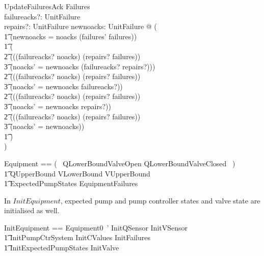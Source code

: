 \documentclass{report} %
\begin{document}
\begin{schema}{UpdateFailuresAck}
    \Delta Failures \\
    failureacks?: \power UnitFailure \\
    repairs?: \power UnitFailure
    \where
    \exists newnoacks: \power UnitFailure @ ( \\
        \t1 (newnoacks = noacks \cup (failures' \setminus failures)) \land \\ %
        \t1 ( \\
            \t2 (((failureacks? \subseteq noacks) \land (repairs? \subseteq failures)) \\
            \t3    \implies (noacks' = newnoacks \setminus (failureacks? \cup repairs?))) \land \\
            \t2 (((failureacks? \subseteq noacks) \land \lnot (repairs? \subseteq failures)) \\ 
            \t3    \implies (noacks' = newnoacks \setminus failureacks?)) \land \\
            \t2 ((\lnot (failureacks? \subseteq noacks) \land (repairs? \subseteq failures)) \\
            \t3    \implies (noacks' = newnoacks \setminus repairs?)) \land \\
            \t2 ((\lnot (failureacks? \subseteq noacks) \land \lnot (repairs? \subseteq failures)) \\
            \t3    \implies (noacks' = newnoacks)) \\
        \t1 ) \\
    )
\end{schema}

\begin{zed}
  Equipment == (~ QLowerBoundValveOpen \lor QLowerBoundValveClosed ~) \land {} \\
    \t1 QUpperBound \land VLowerBound \land VUpperBound \land {} \\
    \t1 ExpectedPumpStates \land EquipmentFailures
\end{zed}

In $InitEquipment$, expected pump and pump controller states and valve state are initialised as well.
\begin{zed}
  InitEquipment == Equipment0~' \land InitQSensor \land InitVSensor \land \\
    \t1 InitPumpCtrSystem \land InitCValues \land InitFailures \land \\
    \t1 InitExpectedPumpStates \land InitValve
\end{zed}
\end{document}
